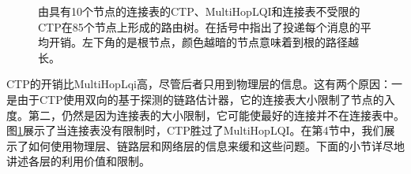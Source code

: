 \documentclass[12pt,a4paper]{article}
\begin{document}
\begin{figure}[ht]
\centering
{}
\caption{由具有10个节点的连接表的CTP、MultiHopLQI和连接表不受限的CTP在85个节点上形成的路由树。在括号中指出了投递每个消息的平均开销。左下角的是根节点，颜色越暗的节点意味着到根的路径越长。}\label{fig2}
\end{figure}

CTP的开销比MultiHopLqi高，尽管后者只用到物理层的信息。这有两个原因：一是由于CTP使用双向的基于探测的链路估计器，它的连接表大小限制了节点的入度。第二，仍然是因为连接表的大小限制，它可能使最好的连接并不在连接表中。图\ref{fig2}展示了当连接表没有限制时，CTP胜过了MultiHopLQI。在第4节中，我们展示了如何使用物理层、链路层和网络层的信息来缓和这些问题。下面的小节详尽地讲述各层的利用价值和限制。
\end{document}
